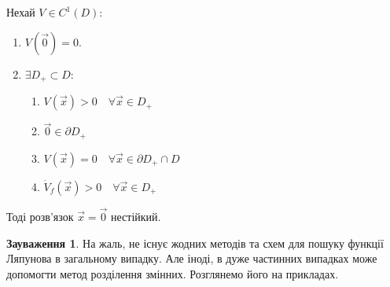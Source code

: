 \documentclass[14pt,a4paper]{scrartcl}
\theoremstyle{definition}
\newtheorem*{remark}{Зауваження}
\theoremstyle{definition}
\theoremstyle{definition}
\begin{document}
\begin{boxteo}
  Нехай $V \in C^{1} (D):$
  \begin{enumerate}
  \item $V(\overrightarrow{0}) = 0$.
  \item $\exists D_+ \subset D$:
  \begin{enumerate}
      \item $V(\overrightarrow{x} ) > 0 \quad \forall \overrightarrow{x} \in D_+$
      \item $\overrightarrow{0} \in \partial D_+ $
      \item $V(\overrightarrow{x}) = 0 \quad \forall \overrightarrow{x} \in \partial D_+ \cap D$
      \item $\dot{V}_f (\overrightarrow{x})>0 \quad \forall \overrightarrow{x }\in D_{+}$
  \end{enumerate}
  \end{enumerate}
  Тоді розв'язок $\overrightarrow{x} = \overrightarrow{0} $ нестійкий.
\end{boxteo}
\begin{remark}
    На жаль, не існує жодних методів та схем для пошуку функції Ляпунова в загальному випадку. Але іноді, в дуже частинних випадках може допомогти метод розділення змінних. Розглянемо його на прикладах.
\end{remark}
\end{document}
